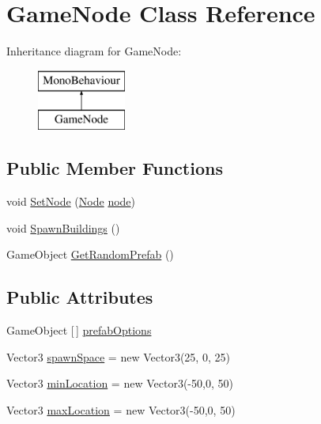 \hypertarget{class_game_node}{}\section{Game\+Node Class Reference}
\label{class_game_node}
Inheritance diagram for Game\+Node\+:\begin{figure}[H]
\begin{center}
\leavevmode
\includegraphics[height=2.000000cm]{class_game_node}
\end{center}
\end{figure}
\subsection*{Public Member Functions}
\begin{DoxyCompactItemize}
\item 
void \mbox{\hyperlink{class_game_node_ac4c8f9eaeeb02827025d4999f461e4f7}{Set\+Node}} (\mbox{\hyperlink{class_node}{Node}} \mbox{\hyperlink{class_game_node_a1358112884b99c36b3a37c4e65c24529}{node}})
\item 
void \mbox{\hyperlink{class_game_node_a28d8bb98f35b26d076a02f656708c798}{Spawn\+Buildings}} ()
\item 
Game\+Object \mbox{\hyperlink{class_game_node_a7769f0664b29bd4ce2178f5c3d511acc}{Get\+Random\+Prefab}} ()
\end{DoxyCompactItemize}
\subsection*{Public Attributes}
\begin{DoxyCompactItemize}
\item 
Game\+Object \mbox{[}$\,$\mbox{]} \mbox{\hyperlink{class_game_node_a7ef395d481491d0bced8c3be6fc62e85}{prefab\+Options}}
\item 
Vector3 \mbox{\hyperlink{class_game_node_a77a1bb6b3f3feaf660ae439ffd2eb416}{spawn\+Space}} = new Vector3(25, 0, 25)
\item 
Vector3 \mbox{\hyperlink{class_game_node_aa7c6a7c1b7d5142f202677b6346078e2}{min\+Location}} = new Vector3(-\/50,0, 50)
\item 
Vector3 \mbox{\hyperlink{class_game_node_a7c5ba008814c712e85e9fea00ab1e29b}{max\+Location}} = new Vector3(-\/50,0, 50)
\end{DoxyCompactItemize}
